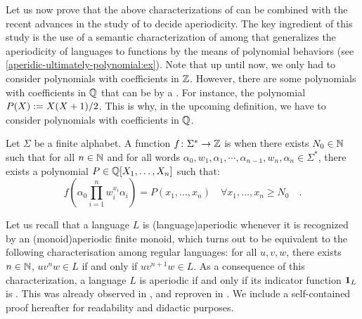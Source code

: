 Let us now prove that the above characterizations of 
 can be combined with the recent advances in
the study of  \cite{CDTL23} to decide
aperiodicity. The key ingredient of this study is the use of a semantic
characterization of  among
 that generalizes the aperiodicity of languages to
functions by the means of polynomial behaviors (see
\cref{aperidic-ultimately-polynomial:ex}). Note that up until now, we only had
to consider polynomials with coefficients in $\mathbb{Z}$. However, there are some
polynomials with coefficients in $\mathbb{Q}$ that can be  by a
. For instance, the polynomial $P(X) \mathrel{:=}
X(X+1)/2$. This is why, in the upcoming definition, we have to consider
polynomials with coefficients in $\mathbb{Q}$.

\begin{definition}
    \label{ultimately-polynomial:def}
    Let $\Sigma$ be a finite alphabet. 
    A function $f \colon \Sigma^* \to \mathbb{Z}$
    is 
    when there exists $N_0 \in \mathbb{N}$ such that
    for all $n \in \mathbb{N}$
    and for all words $\alpha_0, w_1, \alpha_1, \cdots, \alpha_{n-1}, w_n, \alpha_n
    \in \Sigma^*$, there exists a polynomial $P \in \mathbb{Q}[X_1, \dots, X_n]$
    such that:
    \begin{equation*}
        f\left(
            \alpha_0 \prod_{i = 1}^{n} w_i^{x_i} \alpha_i
        \right)
        = 
        P(x_1, \dots, x_n)
        \quad 
        \forall x_1, \dots, x_n \geq N_0
        \quad .
    \end{equation*}
\end{definition}

Let us recall that a language $L$ is \intro(language){aperiodic} whenever it is
recognized by an \kl(monoid){aperiodic} finite monoid, which turns out to be
equivalent to the following characterisation among regular languages: for all
$u,v,w$, there exists $n \in \mathbb{N}$, $u v^n w \in L$ if and only if $u v^{n+1} w
\in L$. As a consequence of this characterization, a language $L$ is aperiodic
if and only if its indicator function $\mathbf{1}_{L}$ is .
This was already observed in \cite[Claim V.6]{CDTL23}, and reproven in
\cite[Claim 7.45, Lemma 7.53]{DOUE23}. We include a self-contained proof
hereafter for readability and didactic purposes.

